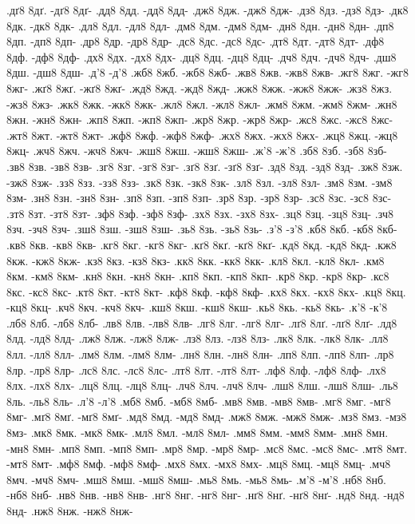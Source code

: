 {.дґ8 8дґ. -дґ8 8дґ-
.дд8 8дд. -дд8 8дд-
.дж8 8дж. -дж8 8дж-
.дз8 8дз. -дз8 8дз-
.дк8 8дк. -дк8 8дк-
.дл8 8дл. -дл8 8дл-
.дм8 8дм. -дм8 8дм-
.дн8 8дн. -дн8 8дн-
.дп8 8дп. -дп8 8дп-
.др8 8др. -др8 8др-
.дс8 8дс. -дс8 8дс-
.дт8 8дт. -дт8 8дт-
.дф8 8дф. -дф8 8дф-
.дх8 8дх. -дх8 8дх-
.дц8 8дц. -дц8 8дц-
.дч8 8дч. -дч8 8дч-
.дш8 8дш. -дш8 8дш-
.д'8 -д'8
.жб8 8жб. -жб8 8жб-
.жв8 8жв. -жв8 8жв-
.жг8 8жг. -жг8 8жг-
.жґ8 8жґ. -жґ8 8жґ-
.жд8 8жд. -жд8 8жд-
.жж8 8жж. -жж8 8жж-
.жз8 8жз. -жз8 8жз-
.жк8 8жк. -жк8 8жк-
.жл8 8жл. -жл8 8жл-
.жм8 8жм. -жм8 8жм-
.жн8 8жн. -жн8 8жн-
.жп8 8жп. -жп8 8жп-
.жр8 8жр. -жр8 8жр-
.жс8 8жс. -жс8 8жс-
.жт8 8жт. -жт8 8жт-
.жф8 8жф. -жф8 8жф-
.жх8 8жх. -жх8 8жх-
.жц8 8жц. -жц8 8жц-
.жч8 8жч. -жч8 8жч-
.жш8 8жш. -жш8 8жш-
.ж'8 -ж'8
.зб8 8зб. -зб8 8зб-
.зв8 8зв. -зв8 8зв-
.зг8 8зг. -зг8 8зг-
.зґ8 8зґ. -зґ8 8зґ-
.зд8 8зд. -зд8 8зд-
.зж8 8зж. -зж8 8зж-
.зз8 8зз. -зз8 8зз-
.зк8 8зк. -зк8 8зк-
.зл8 8зл. -зл8 8зл-
.зм8 8зм. -зм8 8зм-
.зн8 8зн. -зн8 8зн-
.зп8 8зп. -зп8 8зп-
.зр8 8зр. -зр8 8зр-
.зс8 8зс. -зс8 8зс-
.зт8 8зт. -зт8 8зт-
.зф8 8зф. -зф8 8зф-
.зх8 8зх. -зх8 8зх-
.зц8 8зц. -зц8 8зц-
.зч8 8зч. -зч8 8зч-
.зш8 8зш. -зш8 8зш-
.зь8 8зь. -зь8 8зь-
.з'8 -з'8
.кб8 8кб. -кб8 8кб-
.кв8 8кв. -кв8 8кв-
.кг8 8кг. -кг8 8кг-
.кґ8 8кґ. -кґ8 8кґ-
.кд8 8кд. -кд8 8кд-
.кж8 8кж. -кж8 8кж-
.кз8 8кз. -кз8 8кз-
.кк8 8кк. -кк8 8кк-
.кл8 8кл. -кл8 8кл-
.км8 8км. -км8 8км-
.кн8 8кн. -кн8 8кн-
.кп8 8кп. -кп8 8кп-
.кр8 8кр. -кр8 8кр-
.кс8 8кс. -кс8 8кс-
.кт8 8кт. -кт8 8кт-
.кф8 8кф. -кф8 8кф-
.кх8 8кх. -кх8 8кх-
.кц8 8кц. -кц8 8кц-
.кч8 8кч. -кч8 8кч-
.кш8 8кш. -кш8 8кш-
.кь8 8кь. -кь8 8кь-
.к'8 -к'8
.лб8 8лб. -лб8 8лб-
.лв8 8лв. -лв8 8лв-
.лг8 8лг. -лг8 8лг-
.лґ8 8лґ. -лґ8 8лґ-
.лд8 8лд. -лд8 8лд-
.лж8 8лж. -лж8 8лж-
.лз8 8лз. -лз8 8лз-
.лк8 8лк. -лк8 8лк-
.лл8 8лл. -лл8 8лл-
.лм8 8лм. -лм8 8лм-
.лн8 8лн. -лн8 8лн-
.лп8 8лп. -лп8 8лп-
.лр8 8лр. -лр8 8лр-
.лс8 8лс. -лс8 8лс-
.лт8 8лт. -лт8 8лт-
.лф8 8лф. -лф8 8лф-
.лх8 8лх. -лх8 8лх-
.лц8 8лц. -лц8 8лц-
.лч8 8лч. -лч8 8лч-
.лш8 8лш. -лш8 8лш-
.ль8 8ль. -ль8 8ль-
.л'8 -л'8
.мб8 8мб. -мб8 8мб-
.мв8 8мв. -мв8 8мв-
.мг8 8мг. -мг8 8мг-
.мґ8 8мґ. -мґ8 8мґ-
.мд8 8мд. -мд8 8мд-
.мж8 8мж. -мж8 8мж-
.мз8 8мз. -мз8 8мз-
.мк8 8мк. -мк8 8мк-
.мл8 8мл. -мл8 8мл-
.мм8 8мм. -мм8 8мм-
.мн8 8мн. -мн8 8мн-
.мп8 8мп. -мп8 8мп-
.мр8 8мр. -мр8 8мр-
.мс8 8мс. -мс8 8мс-
.мт8 8мт. -мт8 8мт-
.мф8 8мф. -мф8 8мф-
.мх8 8мх. -мх8 8мх-
.мц8 8мц. -мц8 8мц-
.мч8 8мч. -мч8 8мч-
.мш8 8мш. -мш8 8мш-
.мь8 8мь. -мь8 8мь-
.м'8 -м'8
.нб8 8нб. -нб8 8нб-
.нв8 8нв. -нв8 8нв-
.нг8 8нг. -нг8 8нг-
.нґ8 8нґ. -нґ8 8нґ-
.нд8 8нд. -нд8 8нд-
.нж8 8нж. -нж8 8нж-
}

